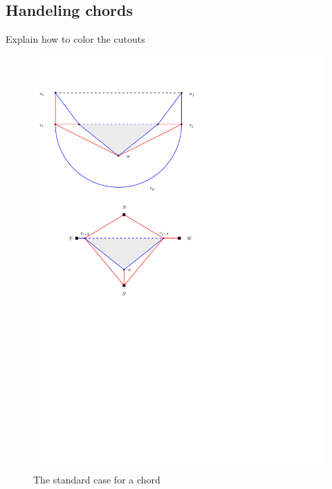 \documentclass[a4paper]{article}
\theoremstyle{definition}
\begin{document}
\subsection{Handeling chords}
Explain how to color the cutouts
\begin{figure}
\includegraphics[scale=1]{img/standardChordColoring}
\caption{The standard case for a chord}
\end{figure}
\end{document}
